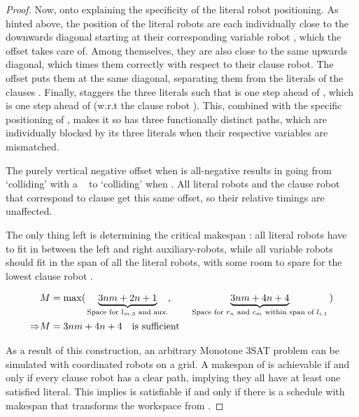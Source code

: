 \begin{proof}
	Now, onto explaining the specificity of the literal robot positioning. As hinted above, the position of the literal robots  are each individually close to the downwards diagonal starting at their corresponding variable robot , which the offset  takes care of. Among themselves, they are also close to the same upwards diagonal, which times them correctly with respect to their clause robot. The offset  puts them at the same diagonal, separating them from the literals of the clauses . Finally,  staggers the three literals such that  is one step ahead of , which is one step ahead of  (w.r.t the clause robot ). This, combined with the specific positioning of , makes it so  has three functionally distinct paths, which are individually blocked by its three literals when their respective variables are mismatched.

	The purely vertical negative offset \ilmath{\phi} when  is all-negative results in  going from `colliding' with a \false\  to `colliding' when . All literal robots  and the clause robot  that correspond to clause  get this same offset, so their relative timings are unaffected.
	
	The only thing left is determining the critical makespan : all literal robots have to fit in between the left and right auxiliary-robots, while all variable robots should fit in the span of all the literal robots, with some room to spare for the lowest clause robot .

	\begin{align*}
		& M = \max (\, 
			\underbrace{3nm + 2n + 1}_{\text{Space for \( l_{m,3} \) and aux.}}, \qquad
			\underbrace{3nm + 4n + 4}_{\text{Space for \( r_n \) and \( c_m \) within span of \( l_{i,1} \)}}
		 \,) \\
		\Rightarrow & M = 3nm + 4n + 4 \quad \text{is sufficient}
	\end{align*}

	As a result of this construction, an arbitrary Monotone 3SAT problem can be simulated with coordinated robots on a grid. A makespan of  is achievable if and only if every clause robot has a clear path, implying they all have at least one satisfied literal. This implies \ilmath{\varphi} is satisfiable if and only if there is a schedule with makespan  that transforms the workspace from .
\end{proof}


